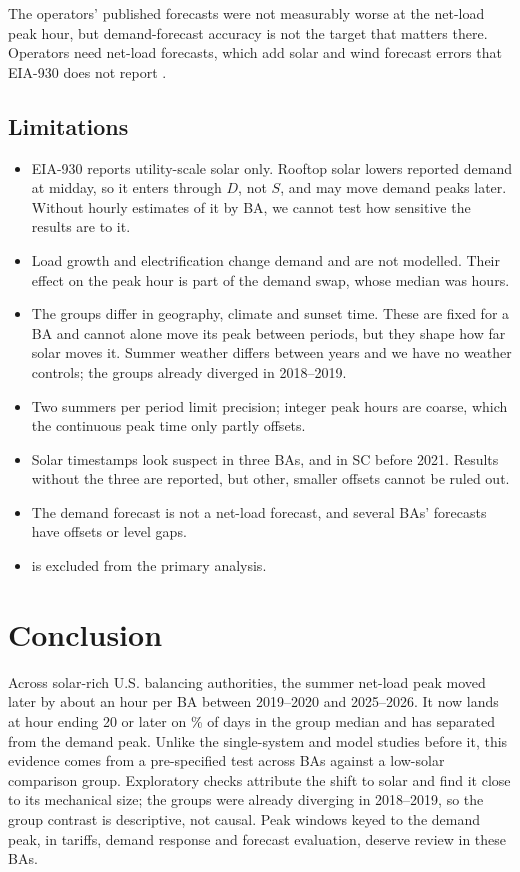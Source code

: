 \documentclass[conference,a4paper]{IEEEtran}
\begin{document}
The operators' published forecasts were not measurably worse at the net-load peak hour, but demand-forecast accuracy is not the target that matters there. Operators need net-load forecasts, which add solar and wind forecast errors that EIA-930 does not report \cite{wang2018netload,kaur2016benefits}.

\subsection*{Limitations}
\begin{itemize}
\item EIA-930 reports utility-scale solar only. Rooftop solar lowers reported demand at midday, so it enters through $D$, not $S$, and may move demand peaks later. Without hourly estimates of it by BA, we cannot test how sensitive the results are to it.
\item Load growth and electrification change demand and are not modelled. Their effect on the peak hour is part of the demand swap, whose median was  hours.
\item The groups differ in geography, climate and sunset time. These are fixed for a BA and cannot alone move its peak between periods, but they shape how far solar moves it. Summer weather differs between years and we have no weather controls; the groups already diverged in 2018--2019.
\item Two summers per period limit precision; integer peak hours are coarse, which the continuous peak time only partly offsets.
\item Solar timestamps look suspect in three BAs, and in SC before 2021. Results without the three are reported, but other, smaller offsets cannot be ruled out.
\item The demand forecast is not a net-load forecast, and several BAs' forecasts have offsets or level gaps.
\item {} is excluded from the primary analysis.
\end{itemize}

\section{Conclusion}
Across  solar-rich U.S. balancing authorities, the summer net-load peak moved later by about an hour per BA between 2019--2020 and 2025--2026. It now lands at hour ending 20 or later on \% of days in the group median and has separated from the demand peak. Unlike the single-system and model studies before it, this evidence comes from a pre-specified test across BAs against a low-solar comparison group. Exploratory checks attribute the shift to solar and find it close to its mechanical size; the groups were already diverging in 2018--2019, so the group contrast is descriptive, not causal. Peak windows keyed to the demand peak, in tariffs, demand response and forecast evaluation, deserve review in these BAs.
\end{document}
